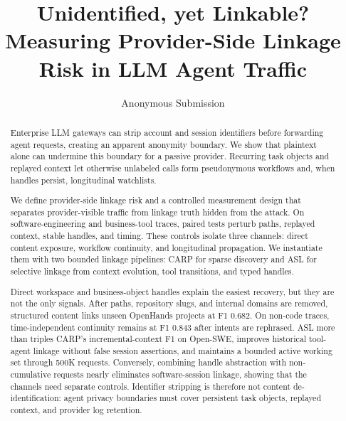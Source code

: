 \documentclass[letterpaper]{article} %
\title{Unidentified, yet Linkable?\\
Measuring Provider-Side Linkage Risk in LLM Agent Traffic}
\author{Anonymous Submission}
\newcommand{\carp}{\textsc{CARP}\xspace}
\newcommand{\asl}{\textsc{ASL}\xspace}
\begin{document}
\maketitle

\begin{abstract}
Enterprise LLM gateways can strip account and session identifiers before forwarding agent requests,
creating an apparent anonymity boundary. We show that plaintext alone can undermine this boundary
for a passive provider. Recurring task objects and replayed context let otherwise unlabeled calls form
pseudonymous workflows and, when handles persist, longitudinal watchlists.

We define provider-side linkage risk and a controlled measurement design that separates
provider-visible traffic from linkage truth hidden from the attack. On software-engineering and
business-tool traces, paired tests perturb paths, replayed context, stable handles, and timing. These
controls isolate three channels: direct content exposure, workflow continuity, and longitudinal
propagation. We instantiate them with two bounded linkage pipelines: \carp for sparse discovery and
\asl for selective linkage from context evolution, tool transitions, and typed handles.

Direct workspace and business-object handles explain the easiest recovery, but they are not the only
signals. After paths, repository slugs, and internal domains are removed, structured content links
unseen OpenHands projects at F1 0.682. On non-code traces, time-independent continuity remains at F1
0.843 after intents are rephrased. \asl more than triples \carp's incremental-context F1 on
Open-SWE, improves historical tool-agent linkage without false session assertions, and maintains a
bounded active working set through 500K requests. Conversely, combining handle abstraction with
non-cumulative requests nearly eliminates software-session linkage, showing that the channels need
separate controls.
Identifier stripping is therefore not content de-identification: agent privacy boundaries must cover
persistent task objects, replayed context, and provider log retention.
\end{abstract}

\begin{links}
\end{links}

\end{document}
